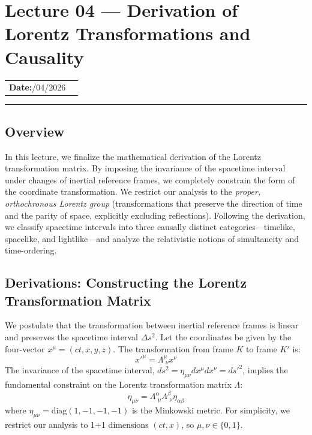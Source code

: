 


\section{Lecture 04 — Derivation of Lorentz Transformations and Causality}\label{sec:lec04:lorentz_and_causality}

\begin{center}
\begin{tabular}{ll}
  \textbf{Date:}\quad 14/04/2026   & \\
\end{tabular}
\end{center}
\hrule\vspace{1.5em}

\subsection*{Overview}
In this lecture, we finalize the mathematical derivation of the Lorentz transformation matrix. By imposing the invariance of the spacetime interval under changes of inertial reference frames, we completely constrain the form of the coordinate transformation. We restrict our analysis to the \textit{proper, orthochronous Lorentz group} (transformations that preserve the direction of time and the parity of space, explicitly excluding reflections). Following the derivation, we classify spacetime intervals into three causally distinct categories—timelike, spacelike, and lightlike—and analyze the relativistic notions of simultaneity and time-ordering.

\subsection*{Derivations: Constructing the Lorentz Transformation Matrix}
We postulate that the transformation between inertial reference frames is linear and preserves the spacetime interval $\Delta s^2$. Let the coordinates be given by the four-vector $x^\mu = (ct, x, y, z)$. The transformation from frame $K$ to frame $K'$ is:
\begin{equation}\label{eq:lec04:linear-transform}
    x'^\mu = \Lambda^\mu_{\,\,\nu} x^\nu
\end{equation}
The invariance of the spacetime interval, $ds^2 = \eta_{\mu\nu} dx^\mu dx^\nu = ds'^2$, implies the fundamental constraint on the Lorentz transformation matrix $\Lambda$:
\begin{equation}\label{eq:lec04:metric-constraint}
    \eta_{\mu\nu} = \Lambda^\alpha_{\,\,\mu} \Lambda^\beta_{\,\,\nu} \eta_{\alpha\beta}
\end{equation}
where $\eta_{\mu\nu} = \text{diag}(1, -1, -1, -1)$ is the Minkowski metric. For simplicity, we restrict our analysis to 1+1 dimensions $(ct, x)$, so $\mu,\nu \in \{0, 1\}$. 

